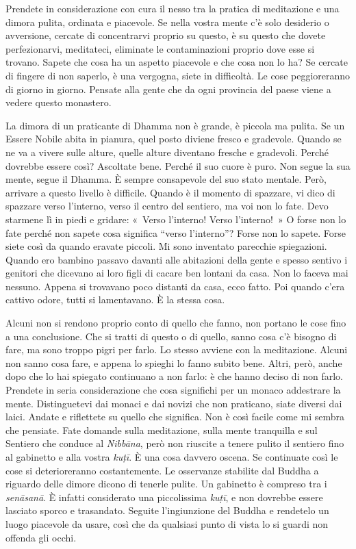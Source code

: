 Prendete in considerazione con cura il nesso tra la pratica di
meditazione e una dimora pulita, ordinata e piacevole. Se nella vostra
mente c'è solo desiderio o avversione, cercate di concentrarvi proprio
su questo, è su questo che dovete perfezionarvi, meditateci, eliminate
le contaminazioni proprio dove esse si trovano. Sapete che cosa ha un
aspetto piacevole e che cosa non lo ha? Se cercate di fingere di non
saperlo, è una vergogna, siete in difficoltà. Le cose peggioreranno di
giorno in giorno. Pensate alla gente che da ogni provincia del paese
viene a vedere questo monastero.

La dimora di un praticante di Dhamma non è grande, è piccola ma pulita.
Se un Essere Nobile abita in pianura, quel posto diviene fresco e
gradevole. Quando se ne va a vivere sulle alture, quelle alture
diventano fresche e gradevoli. Perché dovrebbe essere così? Ascoltate
bene. Perché il suo cuore è puro. Non segue la sua mente, segue il
Dhamma. È sempre consapevole del suo stato mentale. Però, arrivare a
questo livello è difficile. Quando è il momento di spazzare, vi dico di
spazzare verso l'interno, verso il centro del sentiero, ma voi non lo
fate. Devo starmene lì in piedi e gridare: «~Verso l'interno! Verso
l'interno!~» O forse non lo fate perché non sapete cosa significa
``verso l'interno''? Forse non lo sapete. Forse siete così da quando
eravate piccoli. Mi sono inventato parecchie spiegazioni. Quando ero
bambino passavo davanti alle abitazioni della gente e spesso sentivo i
genitori che dicevano ai loro figli di cacare ben lontani da casa. Non
lo faceva mai nessuno. Appena si trovavano poco distanti da casa, ecco
fatto. Poi quando c'era cattivo odore, tutti si lamentavano. È la stessa
cosa.

Alcuni non si rendono proprio conto di quello che fanno, non portano le
cose fino a una conclusione. Che si tratti di questo o di quello, sanno
cosa c'è bisogno di fare, ma sono troppo pigri per farlo. Lo stesso
avviene con la meditazione. Alcuni non sanno cosa fare, e appena lo
spieghi lo fanno subito bene. Altri, però, anche dopo che lo hai
spiegato continuano a non farlo: è che hanno deciso di non farlo.
Prendete in seria considerazione che cosa significhi per un monaco
addestrare la mente. Distinguetevi dai monaci e dai novizi che non
praticano, siate diversi dai laici. Andate e riflettete su quello che
significa. Non è così facile come mi sembra che pensiate. Fate domande
sulla meditazione, sulla mente tranquilla e sul Sentiero che conduce al
\emph{Nibbāna}, però non riuscite a tenere pulito il sentiero fino al
gabinetto e alla vostra \emph{kuṭī}. È una cosa davvero oscena. Se
continuate così le cose si deterioreranno costantemente. Le osservanze
stabilite dal Buddha a riguardo delle dimore dicono di tenerle pulite.
Un gabinetto è compreso tra i \emph{senāsanā}. È infatti considerato una
piccolissima \emph{kuṭī}, e non dovrebbe essere lasciato sporco e
trasandato. Seguite l'ingiunzione del Buddha e rendetelo un luogo
piacevole da usare, così che da qualsiasi punto di vista lo si guardi
non offenda gli occhi.

